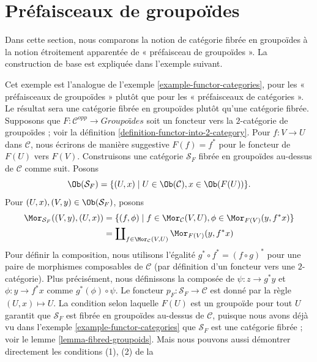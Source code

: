 \section{Préfaisceaux de groupoïdes}
\label{section-presheaves-groupoids}

\noindent
Dans cette section, nous comparons la notion de catégorie fibrée en groupoïdes
à la notion étroitement apparentée de « préfaisceau de groupoïdes ». La construction
de base est expliquée dans l'exemple suivant.

\begin{example}
\label{example-functor-groupoids}
Cet exemple est l'analogue de
l'exemple \ref{example-functor-categories},
pour les « préfaisceaux de groupoïdes » plutôt que pour les « préfaisceaux de catégories ».
Le résultat sera une catégorie fibrée en groupoïdes plutôt qu'une catégorie fibrée.
Supposons que $F : \mathcal{C}^{opp} \to \textit{Groupoïdes}$ soit un foncteur
vers la $2$-catégorie de groupoïdes ; voir la
définition \ref{definition-functor-into-2-category}.
Pour $f : V \to U$ dans $\mathcal{C}$, nous écrirons de manière suggestive
$F(f) = f^\ast$ pour le foncteur de $F(U)$ vers $F(V)$.
Construisons une catégorie $\mathcal{S}_F$ fibrée en groupoïdes au-dessus de $\mathcal{C}$
comme suit. Posons
$$
\Ob(\mathcal{S}_F) =
\{(U, x) \mid U\in \Ob(\mathcal{C}), x\in \Ob(F(U))\}.
$$
Pour $(U, x), (V, y) \in \Ob(\mathcal{S}_F)$, posons
\begin{align*}
\Mor_{\mathcal{S}_F}((V, y), (U, x))
& =
\{ (f, \phi) \mid f \in \Mor_\mathcal{C}(V, U),
\phi \in \Mor_{F(V)}(y, f^\ast x)\} \\
& =
\coprod\nolimits_{f \in \Mor_\mathcal{C}(V, U)}
\Mor_{F(V)}(y, f^\ast x)
\end{align*}
Pour définir la composition, nous utilisons l'égalité $g^\ast \circ f^\ast =
(f \circ g)^\ast$ pour une paire de morphismes composables de $\mathcal{C}$
(par définition d'un foncteur vers une $2$-catégorie).
Plus précisément, nous définissons la composée de $\psi : z \to g^\ast y$ et
$ \phi : y \to f^\ast x$ comme $ g^\ast(\phi) \circ \psi$. Le foncteur
$p_F : \mathcal{S}_F \to \mathcal{C}$ est donné par la règle $(U, x) \mapsto U$.
La condition selon laquelle $F(U)$ est un groupoïde pour tout $U$ garantit que
$\mathcal{S}_F$ est fibrée en groupoïdes au-dessus de $\mathcal{C}$, puisque nous avons
déjà vu dans
l'exemple \ref{example-functor-categories}
que $\mathcal{S}_F$ est une catégorie fibrée ; voir le
lemme \ref{lemma-fibred-groupoids}.
Mais nous pouvons aussi démontrer directement les conditions (1), (2) de la

\end{example}
